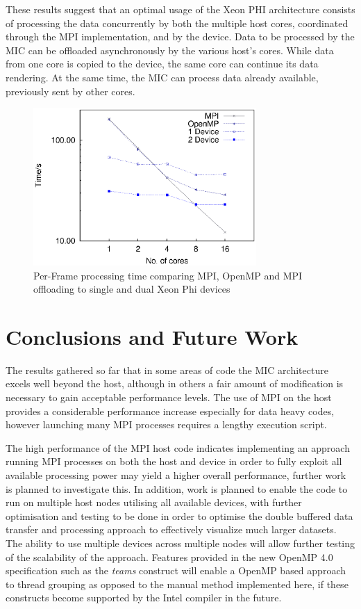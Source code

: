 \documentclass[runningheads,a4paper]{llncs}
\begin{document}
These results suggest that an optimal usage of the Xeon PHI architecture 
consists of processing the data concurrently by both the multiple host cores, coordinated through the MPI
implementation, and by the device.
Data to be processed by the MIC can be offloaded asynchronously by the various host's cores.
While data from one core is copied to the device, the same core can continue its 
data rendering. At the same time, the MIC can process data already available, previously sent by other cores.

\begin{figure}
\centering
\includegraphics[height=6.0cm]{mpi_omp_mic}
\caption{Per-Frame processing time comparing MPI, OpenMP and MPI offloading to single and dual Xeon Phi devices}
\label{fig:mpitimes}
\end{figure}



\section{Conclusions and Future Work}
\label{sect:conclusions}

The results gathered so far that in some areas of code the MIC architecture excels well beyond the host, 
although in others a fair amount of modification is necessary to gain acceptable performance levels. The use of MPI on the host
provides a considerable performance increase especially for data heavy codes, however launching many MPI processes requires a lengthy 
execution script.

The high performance of the MPI host code indicates implementing an approach running MPI processes on both the host and device 
in order to fully exploit all available processing power may yield a higher overall performance, further work is planned to investigate this.
In addition, work is planned to enable the code to run on multiple host nodes utilising all available devices, with further optimisation and 
testing to be done in order to optimise the double buffered data transfer and processing approach to effectively visualize much larger 
datasets. The ability to use multiple devices across multiple nodes will allow further testing of the scalability of the approach. 
Features provided in the new OpenMP 4.0 specification such as the \textit{teams} construct will enable a OpenMP based approach to 
thread grouping as opposed to the manual method implemented here, if these constructs become supported by the Intel compiler in the future. 
\end{document}
